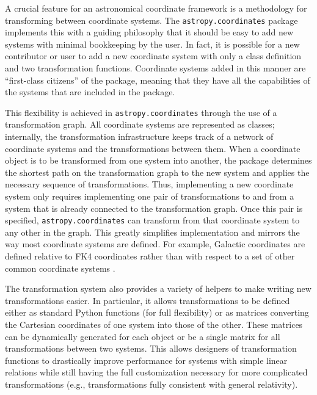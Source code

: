 \documentclass[traditabstract]{aa}
\begin{document}
A crucial feature for an astronomical coordinate framework is a methodology
for transforming between coordinate systems. The \texttt{astropy.coordinates}
package implements this with a guiding philosophy that it should be easy to
add new systems with minimal bookkeeping by the user. In fact, it is possible
for a new contributor or user to add a new coordinate system with only a class
definition and two transformation functions. Coordinate systems added in this
manner are ``first-class citizens'' of the package, meaning that they have all
the capabilities of the systems that are included in the package.

This flexibility is achieved in \texttt{astropy.coordinates} through the use
of a transformation graph. All coordinate systems are represented as classes;
internally, the transformation infrastructure keeps track of a network of
coordinate systems and the transformations between them. When a coordinate
object is to be transformed from one system into another, the package
determines the shortest path on the transformation graph to the new system and
applies the necessary sequence of transformations. Thus, implementing a new
coordinate system only requires implementing one pair of transformations to
and from a system that is already connected to the transformation graph. Once
this pair is specified, \texttt{astropy.coordinates} can transform from that
coordinate system to any other in the graph. This greatly simplifies
implementation and mirrors the way most coordinate systems are defined. For
example, Galactic coordinates are defined relative to FK4 coordinates rather
than with respect to a set of other common coordinate systems
\citep{galcoords, reid04}.

The transformation system also provides a variety of helpers to make writing
new transformations easier. In particular, it allows transformations to be
defined either as standard Python functions (for full flexibility) or as
matrices converting the Cartesian coordinates of one system into those of the
other. These matrices can be dynamically generated for each object or be a
single matrix for all transformations between two systems. This allows
designers of transformation functions to drastically improve performance for
systems with simple linear relations while still having the full customization
necessary for more complicated transformations (e.g., transformations fully
consistent with general relativity).
\end{document}
